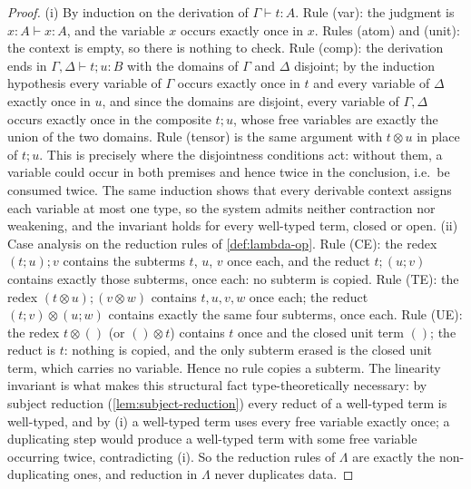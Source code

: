 \begin{proof}
(i) By induction on the derivation of $\Gamma \vdash t : A$. Rule (var): the judgment is $x : A \vdash x : A$, and the variable $x$ occurs exactly once in $x$. Rules (atom) and (unit): the context is empty, so there is nothing to check. Rule (comp): the derivation ends in $\Gamma, \Delta \vdash t ; u : B$ with the domains of $\Gamma$ and $\Delta$ disjoint; by the induction hypothesis every variable of $\Gamma$ occurs exactly once in $t$ and every variable of $\Delta$ exactly once in $u$, and since the domains are disjoint, every variable of $\Gamma, \Delta$ occurs exactly once in the composite $t ; u$, whose free variables are exactly the union of the two domains. Rule (tensor) is the same argument with $t \otimes u$ in place of $t ; u$. This is precisely where the disjointness conditions act: without them, a variable could occur in both premises and hence twice in the conclusion, i.e.\ be consumed twice. The same induction shows that every derivable context assigns each variable at most one type, so the system admits neither contraction nor weakening, and the invariant holds for every well-typed term, closed or open.
(ii) Case analysis on the reduction rules of \autoref{def:lambda-op}. Rule (CE): the redex $(t ; u) ; v$ contains the subterms $t$, $u$, $v$ once each, and the reduct $t ; (u ; v)$ contains exactly those subterms, once each: no subterm is copied. Rule (TE): the redex $(t \otimes u) ; (v \otimes w)$ contains $t, u, v, w$ once each; the reduct $(t ; v) \otimes (u ; w)$ contains exactly the same four subterms, once each. Rule (UE): the redex $t \otimes ()$ (or $() \otimes t$) contains $t$ once and the closed unit term $()$; the reduct is $t$: nothing is copied, and the only subterm erased is the closed unit term, which carries no variable. Hence no rule copies a subterm. The linearity invariant is what makes this structural fact type-theoretically necessary: by subject reduction (\autoref{lem:subject-reduction}) every reduct of a well-typed term is well-typed, and by (i) a well-typed term uses every free variable exactly once; a duplicating step would produce a well-typed term with some free variable occurring twice, contradicting (i). So the reduction rules of $\Lambda$ are exactly the non-duplicating ones, and reduction in $\Lambda$ never duplicates data.

\end{proof}
